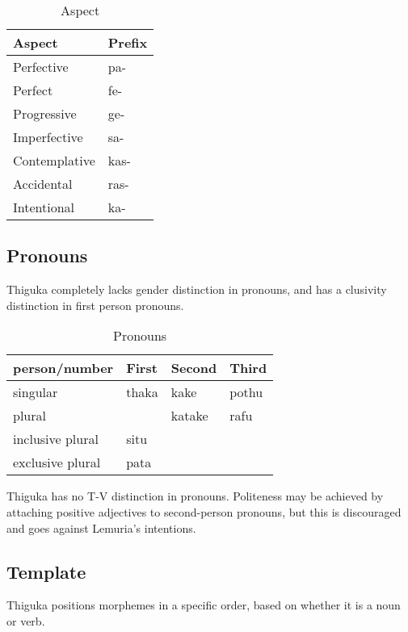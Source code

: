 \begin{table}[h!]
    \centering
    \begin{tabularx}{8cm}{|X|X|}
        \hline
        \textbf{Aspect} & \textbf{Prefix} \\
        \hline
        Perfective & pa- \\
        Perfect & fe- \\
        Progressive & ge- \\
        Imperfective & sa- \\
        Contemplative & kas- \\
        Accidental & ras- \\
        Intentional & ka- \\
        \hline
    \end{tabularx}
    \caption{Aspect}
\end{table}

\subsection{Pronouns}
Thiguka completely lacks gender distinction in pronouns, and has a clusivity distinction in first person pronouns.

\begin{table}[h!]
    \centering
    \begin{tabularx}{15cm}{|X|X|X|X|}
        \hline
        person/number & \textbf{First} & \textbf{Second} & \textbf{Third} \\
        \hline
        singular & thaka & kake & pothu \\
        plural   & & katake & rafu \\
        inclusive plural & situ & & \\
        exclusive plural & pata & & \\
        \hline
    \end{tabularx}
    \caption{Pronouns}
\end{table}

Thiguka has no T-V distinction in pronouns. Politeness may be achieved by attaching positive adjectives to second-person pronouns, but this is discouraged and goes against Lemuria's intentions.

\subsection{Template}
Thiguka positions morphemes in a specific order, based on whether it is a noun or verb.

